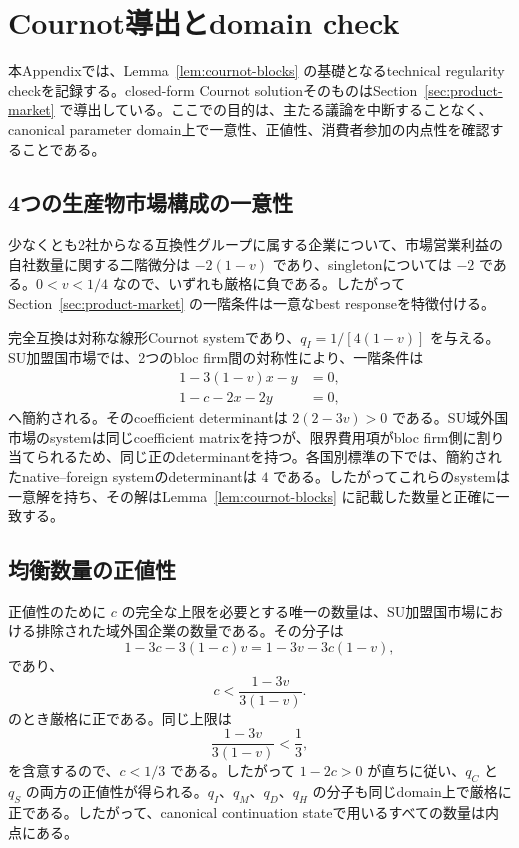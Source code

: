 \section{Cournot導出とdomain check}
\label{app:cournot}

本Appendixでは、Lemma~\ref{lem:cournot-blocks} の基礎となるtechnical regularity checkを記録する。closed-form Cournot solutionそのものはSection~\ref{sec:product-market} で導出している。ここでの目的は、主たる議論を中断することなく、canonical parameter domain上で一意性、正値性、消費者参加の内点性を確認することである。

\subsection{4つの生産物市場構成の一意性}

少なくとも2社からなる互換性グループに属する企業について、市場営業利益の自社数量に関する二階微分は $-2(1-v)$ であり、singletonについては $-2$ である。$0<v<1/4$ なので、いずれも厳格に負である。したがってSection~\ref{sec:product-market} の一階条件は一意なbest responseを特徴付ける。

完全互換は対称な線形Cournot systemであり、$q_I=1/[4(1-v)]$ を与える。SU加盟国市場では、2つのbloc firm間の対称性により、一階条件は
\begin{align}
1-3(1-v)x-y&=0,\\
1-c-2x-2y&=0,
\end{align}
へ簡約される。そのcoefficient determinantは $2(2-3v)>0$ である。SU域外国市場のsystemは同じcoefficient matrixを持つが、限界費用項がbloc firm側に割り当てられるため、同じ正のdeterminantを持つ。各国別標準の下では、簡約されたnative--foreign systemのdeterminantは $4$ である。したがってこれらのsystemは一意解を持ち、その解はLemma~\ref{lem:cournot-blocks} に記載した数量と正確に一致する。

\subsection{均衡数量の正値性}

正値性のために $c$ の完全な上限を必要とする唯一の数量は、SU加盟国市場における排除された域外国企業の数量である。その分子は
\[
1-3c-3(1-c)v
=1-3v-3c(1-v),
\]
であり、
\[
c<\frac{1-3v}{3(1-v)}.
\]
のとき厳格に正である。同じ上限は
\[
\frac{1-3v}{3(1-v)}<\frac13,
\]
を含意するので、$c<1/3$ である。したがって $1-2c>0$ が直ちに従い、$q_C$ と $q_S$ の両方の正値性が得られる。$q_I$、$q_M$、$q_D$、$q_H$ の分子も同じdomain上で厳格に正である。したがって、canonical continuation stateで用いるすべての数量は内点にある。

